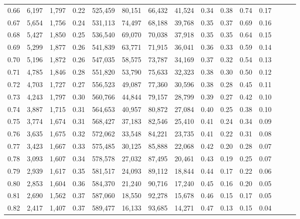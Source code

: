 \begin{tabular}{rrrrrrrrrrrrrrr}
0.66 &   6,197 &  1,797 &  0.22 &  525,459 &   80,151 &   66,432 &   41,524 &  0.34 &  0.38 &  0.74 &      0.17 \\
0.67 &   5,654 &  1,756 &  0.24 &  531,113 &   74,497 &   68,188 &   39,768 &  0.35 &  0.37 &  0.69 &      0.16 \\
0.68 &   5,427 &  1,850 &  0.25 &  536,540 &   69,070 &   70,038 &   37,918 &  0.35 &  0.35 &  0.64 &      0.15 \\
0.69 &   5,299 &  1,877 &  0.26 &  541,839 &   63,771 &   71,915 &   36,041 &  0.36 &  0.33 &  0.59 &      0.14 \\
0.70 &   5,196 &  1,872 &  0.26 &  547,035 &   58,575 &   73,787 &   34,169 &  0.37 &  0.32 &  0.54 &      0.13 \\
0.71 &   4,785 &  1,846 &  0.28 &  551,820 &   53,790 &   75,633 &   32,323 &  0.38 &  0.30 &  0.50 &      0.12 \\
0.72 &   4,703 &  1,727 &  0.27 &  556,523 &   49,087 &   77,360 &   30,596 &  0.38 &  0.28 &  0.45 &      0.11 \\
0.73 &   4,243 &  1,797 &  0.30 &  560,766 &   44,844 &   79,157 &   28,799 &  0.39 &  0.27 &  0.42 &      0.10 \\
0.74 &   3,887 &  1,715 &  0.31 &  564,653 &   40,957 &   80,872 &   27,084 &  0.40 &  0.25 &  0.38 &      0.10 \\
0.75 &   3,774 &  1,674 &  0.31 &  568,427 &   37,183 &   82,546 &   25,410 &  0.41 &  0.24 &  0.34 &      0.09 \\
0.76 &   3,635 &  1,675 &  0.32 &  572,062 &   33,548 &   84,221 &   23,735 &  0.41 &  0.22 &  0.31 &      0.08 \\
0.77 &   3,423 &  1,667 &  0.33 &  575,485 &   30,125 &   85,888 &   22,068 &  0.42 &  0.20 &  0.28 &      0.07 \\
0.78 &   3,093 &  1,607 &  0.34 &  578,578 &   27,032 &   87,495 &   20,461 &  0.43 &  0.19 &  0.25 &      0.07 \\
0.79 &   2,939 &  1,617 &  0.35 &  581,517 &   24,093 &   89,112 &   18,844 &  0.44 &  0.17 &  0.22 &      0.06 \\
0.80 &   2,853 &  1,604 &  0.36 &  584,370 &   21,240 &   90,716 &   17,240 &  0.45 &  0.16 &  0.20 &      0.05 \\
0.81 &   2,690 &  1,562 &  0.37 &  587,060 &   18,550 &   92,278 &   15,678 &  0.46 &  0.15 &  0.17 &      0.05 \\
0.82 &   2,417 &  1,407 &  0.37 &  589,477 &   16,133 &   93,685 &   14,271 &  0.47 &  0.13 &  0.15 &      0.04 \\

\end{tabular}
